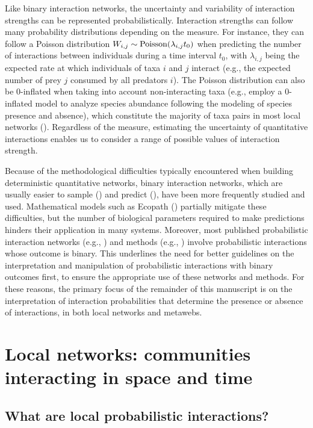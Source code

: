 Like binary interaction networks, the uncertainty and variability of interaction
strengths can be represented probabilistically. Interaction strengths can follow
many probability distributions depending on the measure. For instance, they can
follow a Poisson distribution $W_{i, j} \sim {\rm Poisson}(\lambda_{i, j} t_0)$
when predicting the number of interactions between individuals during a time
interval $t_0$, with $\lambda_{i, j}$ being the expected rate at which
individuals of taxa $i$ and $j$ interact (e.g., the expected number of prey $j$
consumed by all predators $i$). The Poisson distribution can also be
$0$-inflated when taking into account non-interacting taxa (e.g.,
\cite{Boulangeat2012Accounting} employ a $0$-inflated model to analyze species
abundance following the modeling of species presence and absence), which
constitute the majority of taxa pairs in most local networks
(\cite{Jordano2016Sampling}). Regardless of the measure, estimating the
uncertainty of quantitative interactions enables us to consider a range of
possible values of interaction strength. 

Because of the methodological difficulties typically encountered when building
deterministic quantitative networks, binary interaction networks, which are
usually easier to sample (\cite{Jordano2016Sampling}) and predict
(\cite{Strydom2021Roadmapa}), have been more frequently studied and used.
Mathematical models such as Ecopath (\cite{Plaganyi2004Critical}) partially
mitigate these difficulties, but the number of biological parameters required to
make predictions hinders their application in many systems. Moreover, most
published probabilistic interaction networks (e.g., \cite{Strydom2022Food}) and
methods (e.g., \cite{Poisot2016Structure}) involve probabilistic interactions
whose outcome is binary. This underlines the need for better guidelines on the
interpretation and manipulation of probabilistic interactions with binary
outcomes first, to ensure the appropriate use of these networks and methods. For
these reasons, the primary focus of the remainder of this manuscript is on the
interpretation of interaction probabilities that determine the presence or
absence of interactions, in both local networks and metawebs.

\section{Local networks: communities interacting in space and time}

\subsection{What are local probabilistic interactions?}

